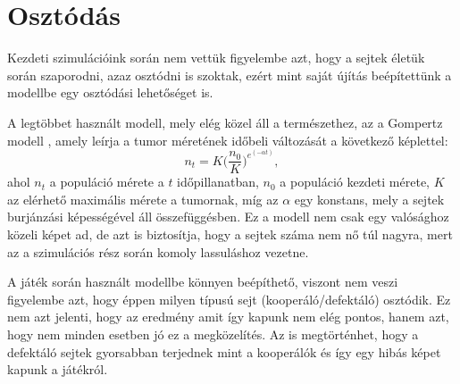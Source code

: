 \section{Osztódás}
Kezdeti szimulációink során nem vettük figyelembe azt, hogy a sejtek életük során szaporodni, azaz osztódni is szoktak, ezért mint saját újítás beépítettünk a modellbe egy osztódási lehetőséget is. 

A legtöbbet használt modell, mely elég közel áll a természethez, az a Gompertz modell \cite{gompertz1825nature}, amely leírja a tumor méretének időbeli változását a következő képlettel:
\begin{equation}
	\label{eq:gompertz}
	n_t = K \bigg(\frac{n_0}{K} \bigg) ^ {e^{(- \alpha t)}},
\end{equation}
ahol $n_t$ a populáció mérete a $t$ időpillanatban, $n_0$ a populáció kezdeti mérete, $K$ az elérhető maximális mérete a tumornak, míg az $\alpha$ egy konstans, mely a sejtek burjánzási képességével áll összefüggésben. Ez a modell nem csak egy valósághoz közeli képet ad, de azt is biztosítja, hogy a sejtek száma nem nő túl nagyra, mert az a szimulációs rész során komoly lassuláshoz vezetne. 

A játék során használt modellbe könnyen beépíthető, viszont nem veszi figyelembe azt, hogy éppen milyen típusú sejt (kooperáló/defektáló) osztódik. Ez nem azt jelenti, hogy az eredmény amit így kapunk nem elég pontos, hanem azt, hogy nem minden esetben jó ez a megközelítés. Az is megtörténhet, hogy a defektáló sejtek gyorsabban terjednek mint a kooperálók és így egy hibás képet kapunk a játékról.